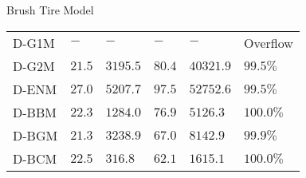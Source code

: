 \begin{frame}{Brush Tire Model}
{\begin{tabularx}{0.8\textwidth}{*{6}{Y}}
    D-G1M %
      & $-$     & $-$      & $-$      & $-$        & Overflow  \\ %
    D-G2M %
      & $21.5$  & $3195.5$ & $80.4$   & $40321.9$  & $99.5\%$  \\ %
    D-ENM %
      & $27.0$  & $5207.7$ & $97.5$   & $52752.6$  & $99.5\%$  \\ %
    D-BBM %
      & $22.3$  & $1284.0$ & $76.9$   & $5126.3$   & $100.0\%$ \\ %
    D-BGM %
      & $21.3$  & $3238.9$ & $67.0$   & $8142.9$   & $99.9\%$  \\ %
    D-BCM %
      & $22.5$  & $316.8$  & $62.1$   & $1615.1$   & $100.0\%$ \\
    \bottomrule
  \end{tabularx}}%
\end{frame}

